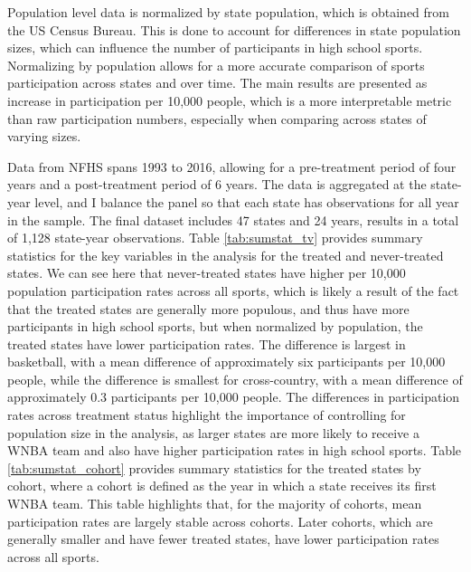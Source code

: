 \documentclass[11pt]{article}
\newcommand{\1}[1]{\mathbb{I}\{#1\}}
\theoremstyle{plain}
\begin{document}
Population level data is normalized by state population, which is obtained from the US Census Bureau. This is done to account for differences in state population sizes, which can influence the number of participants in high school sports. Normalizing by population allows for a more accurate comparison of sports participation across states and over time. The main results are presented as increase in participation per 10,000 people, which is a more interpretable metric than raw participation numbers, especially when comparing across states of varying sizes.

Data from NFHS spans 1993 to 2016, allowing for a pre-treatment period of four years and a post-treatment period of 6 years. The data is aggregated at the state-year level, and I balance the panel so that each state has observations for all year in the sample. The final dataset includes 47 states and 24 years, results in a total of 1,128 state-year observations. Table \ref{tab:sumstat_tv} provides summary statistics for the key variables in the analysis for the treated and never-treated states. We can see here that never-treated states have higher per 10,000 population participation rates across all sports, which is likely a result of the fact that the treated states are generally more populous, and thus have more participants in high school sports, but when normalized by population, the treated states have lower participation rates. The difference is largest in basketball, with a mean difference of approximately six participants per 10,000 people, while the difference is smallest for cross-country, with a mean difference of approximately 0.3 participants per 10,000 people. The differences in participation rates across treatment status highlight the importance of controlling for population size in the analysis, as larger states are more likely to receive a WNBA team and also have higher participation rates in high school sports. Table \ref{tab:sumstat_cohort} provides summary statistics for the treated states by cohort, where a cohort is defined as the year in which a state receives its first WNBA team. This table highlights that, for the majority of cohorts, mean participation rates are largely stable across cohorts. Later cohorts, which are generally smaller and have fewer treated states, have lower participation rates across all sports.
\end{document}
